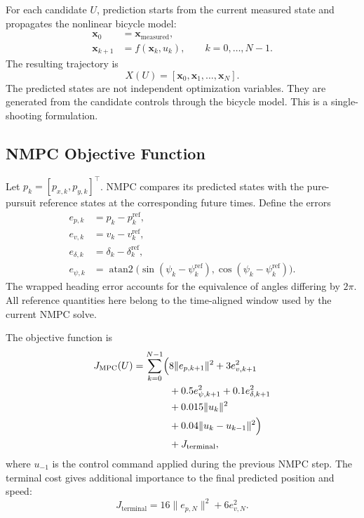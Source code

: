 \documentclass[letterpaper,10pt,conference]{ieeeconf}
\begin{document}
For each candidate $U$, prediction starts from the current measured state
and propagates the nonlinear bicycle model:
\begin{align}
    \mathbf{x}_0 &= \mathbf{x}_{\mathrm{measured}},\\
    \mathbf{x}_{k+1} &= f(\mathbf{x}_k,u_k),
    \qquad k=0,\ldots,N-1.
\end{align}
The resulting trajectory is
\begin{equation}
    X(U)=[\mathbf{x}_0,\mathbf{x}_1,\ldots,\mathbf{x}_N].
\end{equation}
The predicted states are not independent optimization variables. They are
generated from the candidate controls through the bicycle model. This is
a single-shooting formulation.

\subsection{NMPC Objective Function}

Let $p_k=[p_{x,k},p_{y,k}]^\top$. NMPC compares its predicted states with
the pure-pursuit reference states at the corresponding future times.
Define the errors
\begin{align}
    e_{p,k} &= p_k-p_k^{\mathrm{ref}},\\
    e_{v,k} &= v_k-v_k^{\mathrm{ref}},\\
    e_{\delta,k} &= \delta_k-\delta_k^{\mathrm{ref}},\\
    e_{\psi,k} &= \operatorname{atan2}\bigl(
       \sin(\psi_k-\psi_k^{\mathrm{ref}}),
       \cos(\psi_k-\psi_k^{\mathrm{ref}})\bigr).
\end{align}
The wrapped heading error accounts for the equivalence of angles differing
by $2\pi$. All reference quantities here belong to the time-aligned window
used by the current NMPC solve.

The objective function is
\begin{equation}
\begin{aligned}
    J_{\mathrm{MPC}}(U)=\sum_{k=0}^{N-1}\Bigl(
        &8\|e_{p,k+1}\|^2+3e_{v,k+1}^{2}\\
        &+0.5e_{\psi,k+1}^{2}+0.1e_{\delta,k+1}^{2}\\
        &+0.015\|u_k\|^2\\
        &+0.04\|u_k-u_{k-1}\|^2\Bigr)\\
        &+J_{\mathrm{terminal}},
\end{aligned}
    \label{eq:mpc-cost}
\end{equation}
where $u_{-1}$ is the control command applied during the previous NMPC
step. The terminal cost gives additional importance to the final predicted
position and speed:
\begin{equation}
    J_{\mathrm{terminal}}=16\|e_{p,N}\|^2+6e_{v,N}^{2}.
    \label{eq:terminal-cost}
\end{equation}
\end{document}
